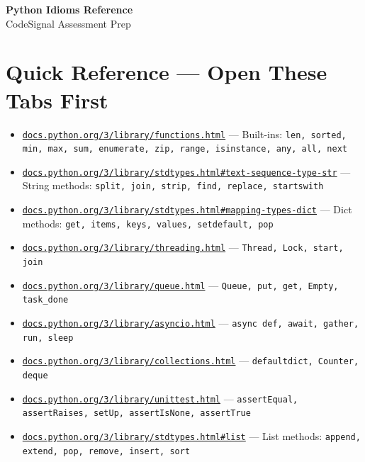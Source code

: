 \documentclass[10pt,letterpaper]{article}
\begin{document}
\begin{center}
  {\LARGE \textbf{Python Idioms Reference}}\\[4pt]
  {\normalsize CodeSignal Assessment Prep}
\end{center}

\vspace{6pt}

\section*{Quick Reference --- Open These Tabs First}

\begin{itemize}[noitemsep,leftmargin=*]
  \item \href{https://docs.python.org/3/library/functions.html}{\texttt{docs.python.org/3/library/functions.html}} --- Built-ins: \texttt{len, sorted, min, max, sum, enumerate, zip, range, isinstance, any, all, next}
  \item \href{https://docs.python.org/3/library/stdtypes.html#text-sequence-type-str}{\texttt{docs.python.org/3/library/stdtypes.html\#text-sequence-type-str}} --- String methods: \texttt{split, join, strip, find, replace, startswith}
  \item \href{https://docs.python.org/3/library/stdtypes.html#mapping-types-dict}{\texttt{docs.python.org/3/library/stdtypes.html\#mapping-types-dict}} --- Dict methods: \texttt{get, items, keys, values, setdefault, pop}
  \item \href{https://docs.python.org/3/library/threading.html}{\texttt{docs.python.org/3/library/threading.html}} --- \texttt{Thread, Lock, start, join}
  \item \href{https://docs.python.org/3/library/queue.html}{\texttt{docs.python.org/3/library/queue.html}} --- \texttt{Queue, put, get, Empty, task\_done}
  \item \href{https://docs.python.org/3/library/asyncio.html}{\texttt{docs.python.org/3/library/asyncio.html}} --- \texttt{async def, await, gather, run, sleep}
  \item \href{https://docs.python.org/3/library/collections.html}{\texttt{docs.python.org/3/library/collections.html}} --- \texttt{defaultdict, Counter, deque}
  \item \href{https://docs.python.org/3/library/unittest.html}{\texttt{docs.python.org/3/library/unittest.html}} --- \texttt{assertEqual, assertRaises, setUp, assertIsNone, assertTrue}
  \item \href{https://docs.python.org/3/library/stdtypes.html#list}{\texttt{docs.python.org/3/library/stdtypes.html\#list}} --- List methods: \texttt{append, extend, pop, remove, insert, sort}
\end{itemize}
\end{document}
